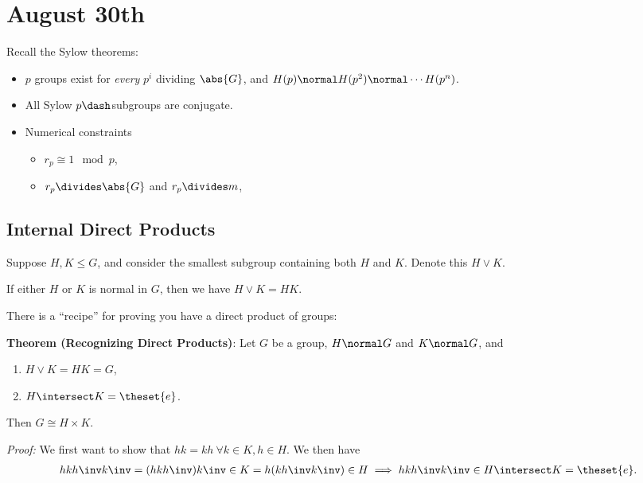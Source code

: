\hypertarget{august-30th}{%
\section{August 30th}\label{august-30th}}

Recall the Sylow theorems:

\begin{itemize}
\item
  \(p\) groups exist for \emph{every} \(p^i\) dividing \(\abs{G}\), and
  \(H(p) \normal H(p^2) \normal \cdots H(p^n)\).
\item
  All Sylow \(p\dash\)subgroups are conjugate.
\item
  Numerical constraints

  \begin{itemize}
  \item
    \(r_p \cong 1 \mod p\),
  \item
    \(r_p \divides \abs{G}\) and \(r_p \divides m\),
  \end{itemize}
\end{itemize}

\hypertarget{internal-direct-products}{%
\subsection{Internal Direct Products}\label{internal-direct-products}}

Suppose \(H, K \leq G\), and consider the smallest subgroup containing
both \(H\) and \(K\). Denote this \(H \vee K\).

If either \(H\) or \(K\) is normal in \(G\), then we have
\(H\vee K = HK\).

There is a ``recipe'' for proving you have a direct product of groups:

\textbf{Theorem (Recognizing Direct Products)}: Let \(G\) be a group,
\(H \normal G\) and \(K\normal G\), and

\begin{enumerate}
\def\labelenumi{\arabic{enumi}.}
\item
  \(H\vee K = HK = G\),
\item
  \(H \intersect K = \theset{e}\).
\end{enumerate}

Then \(G \cong H \times K\).

\emph{Proof:} We first want to show that
\(hk = kh ~\forall k\in K, h\in H\). We then have
\begin{align*}
hkh\inv k\inv = (hkh\inv)k\inv \in K = h(kh\inv k\inv) \in H \implies hkh\inv k\inv \in H\intersect K = \theset{e}.
\end{align*}

